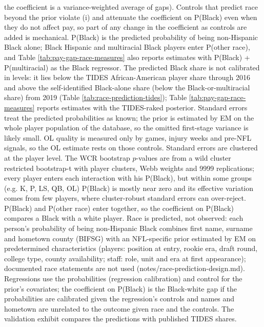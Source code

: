 \begin{table}[!h]
{\begin{threeparttable}
\begin{tablenotes}[para]
the coefficient is a variance-weighted average of gaps). Controls that predict race beyond the prior violate (i) and attenuate the coefficient on P(Black) even when they do not affect pay, so part of any change in the coefficient as controls are added is mechanical. P(Black) is the predicted probability of being non-Hispanic Black alone; Black Hispanic and multiracial Black players enter P(other race), and Table \ref{tab:pay-gap-race-measures} also reports estimates with P(Black) + P(multiracial) as the Black regressor. The predicted Black share is not calibrated in levels: it lies below the TIDES African-American player share through 2016 and above the self-identified Black-alone share (below the Black-or-multiracial share) from 2019 (Table \ref{tab:race-prediction-tides}); Table \ref{tab:pay-gap-race-measures} reports estimates with the TIDES-raked posterior. Standard errors treat the predicted probabilities as known; the prior is estimated by EM on the whole player population of the database, so the omitted first-stage variance is likely small. OL quality is measured only by games, injury weeks and pre-NFL signals, so the OL estimate rests on those controls. Standard errors are clustered at the player level. The WCR bootstrap $p$-values are from a wild cluster restricted bootstrap-t with player clusters, Webb weights and 9999 replications; every player enters each interaction with his P(Black), but within some groups (e.g. K, P, LS, QB, OL) P(Black) is mostly near zero and its effective variation comes from few players, where cluster-robust standard errors can over-reject. P(Black) and P(other race) enter together, so the coefficient on P(Black) compares a Black with a white player. Race is predicted, not observed: each person's probability of being non-Hispanic Black combines first name, surname and hometown county (BIFSG) with an NFL-specific prior estimated by EM on predetermined characteristics (players: position at entry, rookie era, draft round, college type, county availability; staff: role, unit and era at first appearance); documented race statements are not used (notes/race-prediction-design.md). Regressions use the probabilities (regression calibration) and control for the prior's covariates; the coefficient on P(Black) is the Black-white gap if the probabilities are calibrated given the regression's controls and names and hometown are unrelated to the outcome given race and the controls. The validation exhibit compares the predictions with published TIDES shares.
\end{tablenotes}
\end{threeparttable}}
\end{table}
